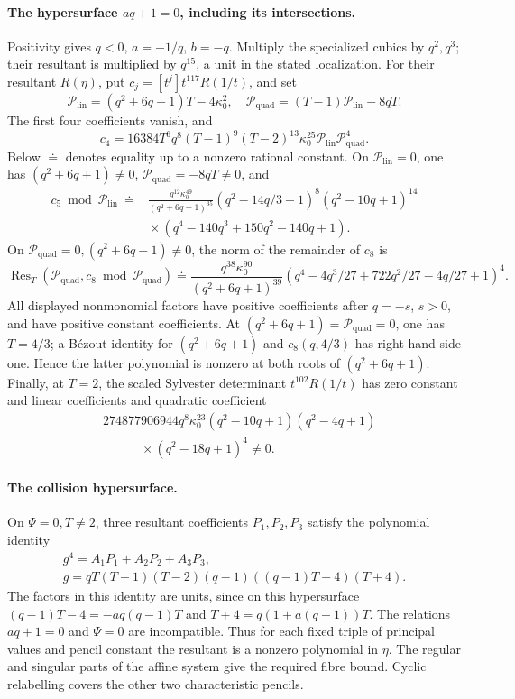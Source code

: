 \documentclass[11pt,a4paper]{article}
\numberwithin{equation}{section}
\theoremstyle{plain}
\theoremstyle{definition}
\theoremstyle{remark}
\begin{document}
\paragraph{The hypersurface \(aq+1=0\), including its intersections.}
Positivity gives \(q<0\), \(a=-1/q\), \(b=-q\).
Multiply the specialized cubics by \(q^2,q^3\); their resultant
is multiplied by \(q^{15}\), a unit in the stated localization.  For their resultant
\(R(\eta)\), put \(c_j=[t^j]t^{117}R(1/t)\), and set
\[
 \mathcal P_{\mathrm{lin}}=(q^2+6q+1) T-4\kappa_0 ^2,\quad
 \mathcal P_{\mathrm{quad}}=(T-1)\mathcal P_{\mathrm{lin}}-8qT.
\]
The first four coefficients vanish, and
\[
 c_4=16384T^6q^8(T-1)^9(T-2)^{13}\kappa_0 ^{25}
       \mathcal P_{\mathrm{lin}}\mathcal P_{\mathrm{quad}}^4.
\]
Below \(\doteq\) denotes equality up to a nonzero rational constant.
On \(\mathcal P_{\mathrm{lin}}=0\), one has \((q^2+6q+1)\ne0\),
\(\mathcal P_{\mathrm{quad}}=-8qT\ne0\), and
\[
 \begin{aligned}
 c_5\bmod\mathcal P_{\mathrm{lin}}\ \doteq{}&
 \frac{q^{12}\kappa_0 ^{49}}{(q^2+6q+1)^{35}}
 (q^2-14q/3+1)^8(q^2-10q+1)^{14}\\
 &{}\times(q^4-140q^3+150q^2-140q+1).
 \end{aligned}
\]
On \(\mathcal P_{\mathrm{quad}}=0,(q^2+6q+1)\ne0\), the norm of the remainder of
\(c_8\) is
\[
 \operatorname{Res}_T(\mathcal P_{\mathrm{quad}},c_8\bmod\mathcal P_{\mathrm{quad}})
 \doteq\frac{q^{38}\kappa_0 ^{90}}{(q^2+6q+1)^{39}}
 (q^4-4q^3/27+722q^2/27-4q/27+1)^4.
\]
All displayed nonmonomial factors have positive coefficients after
\(q=-s\), \(s>0\), and have positive constant coefficients.
At \((q^2+6q+1)=\mathcal P_{\mathrm{quad}}=0\), one has \(T=4/3\); a
B\'ezout identity for \((q^2+6q+1)\) and
\(c_8(q,4/3)\) has right hand side one. Hence the latter polynomial
is nonzero at both roots of \((q^2+6q+1)\).
Finally, at \(T=2\), the scaled Sylvester determinant
\(t^{102}R(1/t)\) has zero constant and linear coefficients and
quadratic coefficient
\[
 \begin{aligned}
 &274877906944q^8\kappa_0 ^{23}(q^2-10q+1)(q^2-4q+1)\\
 &\hspace{3em}{}\times(q^2-18q+1)^4\ne0.
 \end{aligned}
\]

\paragraph{The collision hypersurface.}
On \(\Psi=0,T\ne2\), three resultant coefficients
\(P_1,P_2,P_3\) satisfy the polynomial identity
\[
 \begin{gathered}
 g^4=A_1P_1+A_2P_2+A_3P_3,\\
 g=qT(T-1)(T-2)(q-1)((q-1)T-4)(T+4).
 \end{gathered}
\]
The factors in this identity are units, since on this hypersurface
\((q-1)T-4=-aq(q-1)T\) and \(T+4=q(1+a(q-1))T\).
The relations $aq+1=0$ and $\Psi=0$ are incompatible.
Thus for each fixed triple of principal values and pencil constant the resultant is a
nonzero polynomial in \(\eta\). The regular and singular parts of the
affine system give the required fibre bound. Cyclic relabelling
covers the other two characteristic pencils.
\end{document}
